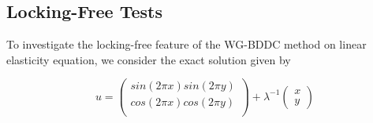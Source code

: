 									\subsection{Locking-Free Tests}
									
									To investigate the locking-free feature of the WG-BDDC method on linear elasticity equation, we consider the exact solution given by
									
									\begin{equation}
									u = \begin{pmatrix}
									sin(2 \pi x) sin(2 \pi y) \\ cos(2 \pi x) cos(2 \pi y) \\
									\end{pmatrix} + \lambda^{-1} \begin{pmatrix}
									x \\ y
									\end{pmatrix}
									\end{equation}
									
